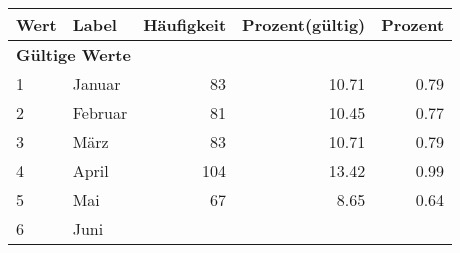      \begin{longtable}{lXrrr}
     \toprule
     \textbf{Wert} & \textbf{Label} & \textbf{Häufigkeit} & \textbf{Prozent(gültig)} & \textbf{Prozent} \\
     \endhead
     \midrule
     \multicolumn{5}{l}{\textbf{Gültige Werte}}\\

     1 &
     \multicolumn{1}{X}{ Januar   } &


       \num{83} &
       \num[round-mode=places,round-precision=2]{10,71} &
         \num[round-mode=places,round-precision=2]{0,79} \\

     2 &
     \multicolumn{1}{X}{ Februar   } &


       \num{81} &
       \num[round-mode=places,round-precision=2]{10,45} &
         \num[round-mode=places,round-precision=2]{0,77} \\

     3 &
     \multicolumn{1}{X}{ März   } &


       \num{83} &
       \num[round-mode=places,round-precision=2]{10,71} &
         \num[round-mode=places,round-precision=2]{0,79} \\

     4 &
     \multicolumn{1}{X}{ April   } &


       \num{104} &
       \num[round-mode=places,round-precision=2]{13,42} &
         \num[round-mode=places,round-precision=2]{0,99} \\

     5 &
     \multicolumn{1}{X}{ Mai   } &


       \num{67} &
       \num[round-mode=places,round-precision=2]{8,65} &
         \num[round-mode=places,round-precision=2]{0,64} \\

     6 &
     \multicolumn{1}{X}{ Juni   } &



\end{longtable}
